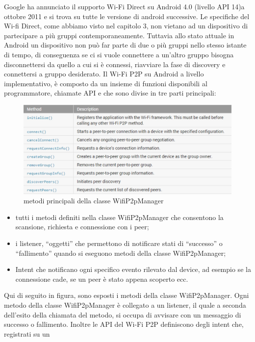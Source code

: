 Google ha annunciato il supporto Wi-Fi Direct su Android 4.0 (livello API 14)a ottobre 2011
\cite{wikiDi} e si trova su tutte le versione di android successive.
Le specifiche del Wi-fi Direct, come abbiamo visto nel capitolo 3,
non vietano ad un dispositivo di partecipare a più gruppi contemporaneamente.
Tuttavia allo stato attuale in Android  un dispositivo non
può far parte di due o più gruppi
nello stesso istante di tempo,
di conseguenza se ci si vuole connettere a un'altro gruppo
bisogna disconnettersi da quello a cui si è connessi, riavviare la fase di discovery
e connettersi a gruppo desiderato.
Il Wi-Fi P2P su Android a livello implementativo, è composto da un insieme di
funzioni disponibili al programmatore, chiamate API e che sono divise in tre parti
principali:
\begin{figure}
   \centering
   \caption{metodi principali della classe WifiP2pManager}
   \includegraphics[width=1\columnwidth]{imgs/wifip2pmanagerMet.jpg}
\end{figure}
\begin{itemize}
   \item tutti i metodi definiti nella classe WifiP2pManager che
   consentono la scansione,
   richiesta e connessione con i peer;
   \item i listener, “oggetti” che permettono di notificare
   stati di “successo” o
   “fallimento” quando si eseguono metodi della classe WifiP2pManager;
   \item Intent che notificano ogni
   specifico evento rilevato dal device, ad
   esempio se la connessione cade, se un peer è stato appena scoperto ecc.
\end{itemize}
Qui di seguito in figura, sono esposti i metodi della classe WifiP2pManager.
Ogni metodo della classe WifiP2pManager è collegato a un listener, il quale a
seconda dell’esito della chiamata del metodo, si occupa di avvisare con un
messaggio di successo o fallimento.
Inoltre le API del Wi-Fi P2P definiscono degli intent che, registrati su un
